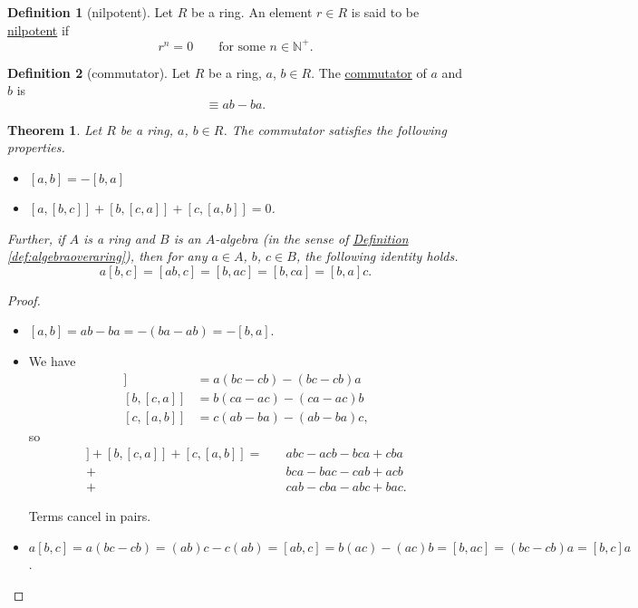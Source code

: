 \documentclass[a4paper,10pt]{scrreprt}
\newcommand{\N}{\mathbb{N}}
\newcommand{\defn}[1]{\ul{#1}}
\theoremstyle{definition}
\newtheorem{definition}{Definition}[section]
\theoremstyle{plain}
\newtheorem{theorem}{Theorem}[section]
\theoremstyle{remark}
\begin{document}
\begin{definition}[nilpotent]
  \label{def:nilpotent}
  Let $R$ be a ring. An element $r \in R$ is said to be \defn{nilpotent} if 
  \begin{equation*}
    r^{n} = 0\qquad\text{for some } n \in \N^{+}.
  \end{equation*}
\end{definition}
\begin{definition}[commutator]
  \label{def:commutator}
  Let $R$ be a ring, $a$, $b \in R$. The \defn{commutator} of $a$ and $b$ is 
  \begin{equation*}
    [a,b] \equiv ab-ba.
  \end{equation*}
\end{definition}
\begin{theorem}
  \label{thm:propertiesofcommutator}
  Let $R$ be a ring, $a$, $b \in R$. The commutator satisfies the following properties.
  \begin{itemize}
    \item $[a,b] = -[b,a]$
    \item $[a,[b,c]] + [b,[c,a]] + [c,[a,b]] = 0$.
  \end{itemize}
  Further, if $A$ is a ring and $B$ is an $A$-algebra (in the sense of \hyperref[def:algebraoveraring]{Definition \ref*{def:algebraoveraring}}), then for any $a\in A$, $b$, $c \in B$, the following identity holds.
  \begin{equation*}
    a[b,c] = [ab,c] = [b,ac] = [b,ca] = [b,a]c.
  \end{equation*}
\end{theorem}
\begin{proof}
  $\,$
  \begin{itemize}
    \item $[a,b] = ab-ba=-(ba-ab)=-[b,a]$.
    \item We have 
      \begin{align*}
        [a,[b,c]] &= a(bc-cb) - (bc-cb)a \\
        [b,[c,a]] &= b(ca-ac) - (ca-ac)b \\
        [c,[a,b]] &= c(ab-ba) - (ab-ba)c,
      \end{align*}
      so
      \begin{align*}
        [a,[b,c]]+[b,[c,a]]+[c,[a,b]] =\quad& abc - acb - bca + cba \\
        +& bca - bac - cab + acb \\
        +& cab - cba - abc + bac.
      \end{align*}

      Terms cancel in pairs.

    \item $a[b,c] = a(bc-cb) = (ab)c - c(ab) = [ab,c] = b(ac)-(ac)b = [b,ac] = (bc-cb)a = [b,c]a$.
  \end{itemize}
\end{proof}
\end{document}
